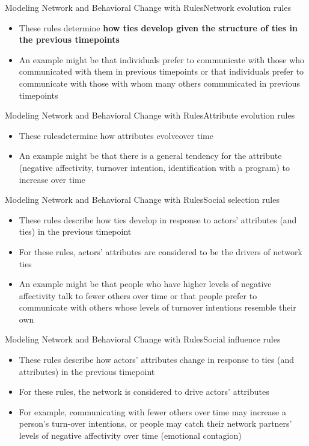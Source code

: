 \documentclass[notes, aspectratio=1610]{beamer}
\begin{document}
\begin{frame}{Modeling Network and Behavioral Change with Rules}{Network evolution rules}
	\begin{itemize}
	\item These rules determine \textbf{how ties develop given the structure of ties in 
	the previous timepoints}
	\item An example might be that individuals prefer 
	to communicate with those who communicated with them in previous 
	timepoints or that individuals prefer to communicate with those with 
	whom many others communicated in previous timepoints
	\end{itemize}
\end{frame}


\begin{frame}{Modeling Network and Behavioral Change with Rules}{Attribute evolution rules}
	\begin{itemize}
		\item  These rulesdetermine how attributes evolveover time
		\item An example might be that there is a general tendency for 
		the attribute (negative affectivity, turnover intention, 
		identification with a program) to increase over time
	\end{itemize}
\end{frame}

\begin{frame}{Modeling Network and Behavioral Change with Rules}{Social selection rules}
	\begin{itemize}
		\item These rules describe how ties develop in response to 
		actors' attributes (and ties) in the previous timepoint
		\item For these rules, actors' attributes are considered to be 
		the drivers of network ties
		\item An example might be that people who have higher levels of 
		negative affectivity talk to fewer others over time or that
		people prefer to communicate with others whose levels of 
		turnover intentions resemble their own
	\end{itemize}
\end{frame}

\begin{frame}{Modeling Network and Behavioral Change with Rules}{Social influence rules}
\begin{itemize}
	\item These rules describe how actors' attributes change in response 
	to ties (and attributes) in the previous timepoint
	\item For these rules, the network is considered to drive actors' 
	attributes
	\item For example, communicating with fewer others over time may 
	increase a person's turn-over intentions, or people may catch their 
	network partners' levels of negative affectivity over time (emotional 
	contagion)
\end{itemize}
\end{frame}
\end{document}
